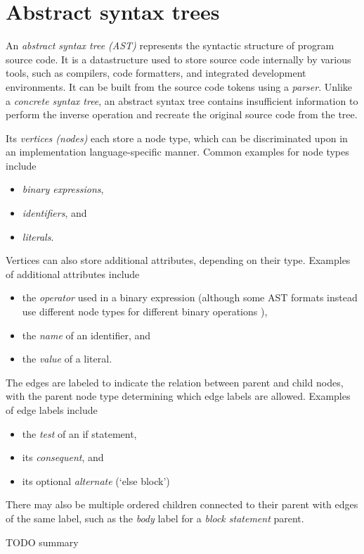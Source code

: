 \chapter{Abstract syntax trees}
An \textit{abstract syntax tree (AST)} represents
the syntactic structure of program source code.
It is a datastructure used to
store source code internally by various tools,
such as compilers, code formatters, and
integrated development environments.
It can be built from the source code tokens using a \textit{parser}.
Unlike a \textit{concrete syntax tree},
an abstract syntax tree contains insufficient information
to perform the inverse operation and
recreate the original source code from the tree.
\autocite{AstImplIdioms}

Its \textit{vertices (nodes)} each store a node type,
which can be discriminated upon
in an implementation language-specific manner.
Common examples for node types include
\begin{itemize}
  \item \textit{binary expressions},
  \item \textit{identifiers}, and
  \item \textit{literals}.
\end{itemize}
Vertices can also store additional attributes,
depending on their type.
Examples of additional attributes include
\begin{itemize}
  \item the \textit{operator} used in a binary expression
  (although some AST formats instead use different node types
  for different binary operations \autocite{AstImplIdioms}),
  \item the \textit{name} of an identifier, and
  \item the \textit{value} of a literal.
\end{itemize}

The edges are labeled to indicate
the relation between parent and child nodes,
with the parent node type determining
which edge labels are allowed.
Examples of edge labels include
\begin{itemize}
  \item the \textit{test} of an if statement,
  \item its \textit{consequent}, and
  \item its optional \textit{alternate} (`else block')
\end{itemize}
There may also be multiple ordered children
connected to their parent with edges of the same label,
such as the \textit{body} label
for a \textit{block statement} parent.





TODO summary
